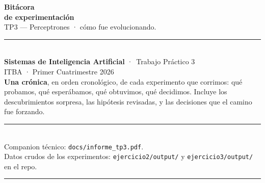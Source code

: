\documentclass[11pt,a4paper]{article}
\newcommand{\file}[1]{\texttt{\small #1}}
\begin{document}
\begin{titlepage}
\thispagestyle{empty}

\vspace*{3cm}
\begin{flushleft}
{\fontsize{42}{48}\selectfont\bfseries\color{ink}Bitácora}\\[0.4em]
{\fontsize{32}{38}\selectfont\bfseries\color{accent}de experimentación}\\[0.6em]
{\Large\color{muted}TP3 — Perceptrones · cómo fue evolucionando.}\\[2em]

\rule{\linewidth}{0.4pt}\\[0.6em]
{\large\textbf{Sistemas de Inteligencia Artificial} \textcolor{muted}{·}\ Trabajo Práctico 3}\\[0.3em]
{\large\color{muted}ITBA · Primer Cuatrimestre 2026}\\[3em]

\textbf{Una crónica}, en orden cronológico, de cada experimento que corrimos: qué probamos, qué esperábamos, qué obtuvimos, qué decidimos. Incluye los descubrimientos sorpresa, las hipótesis revisadas, y las decisiones que el camino fue forzando.
\end{flushleft}

\vfill
\begin{flushleft}
\rule{\linewidth}{0.4pt}\\[0.4em]
\textcolor{muted}{\small Companion técnico: \file{docs/informe\_tp3.pdf}.\\
Datos crudos de los experimentos: \file{ejercicio2/output/} y \file{ejercicio3/output/} en el repo.}
\end{flushleft}
\end{titlepage}

\tableofcontents
\bigskip\hrule\bigskip
\end{document}
